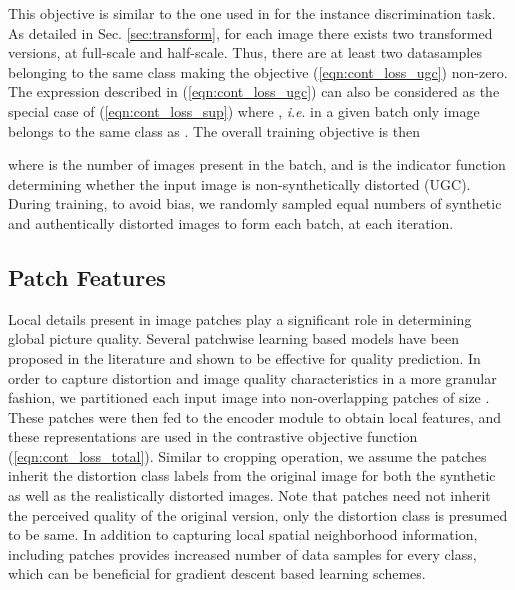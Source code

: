 \documentclass[journal]{IEEEtran}
\newcommand{\ie}{\textit{i}.\textit{e}.}
\begin{document}
This objective is similar to the one used in \cite{chen2020simple,he2020momentum} for the instance discrimination task. As detailed in Sec. \ref{sec:transform}, for each image there exists two transformed versions, at full-scale and half-scale. Thus, there are at least two datasamples belonging to the same class making the objective (\ref{eqn:cont_loss_ugc}) non-zero. The expression described in (\ref{eqn:cont_loss_ugc}) can also be considered as the special case of (\ref{eqn:cont_loss_sup}) where , \ie{} in a given batch only image  belongs to the same class as . The overall training objective is then

where  is the number of images present in the batch, and  is the indicator function determining whether the input image is non-synthetically distorted (UGC). During training, to avoid bias, we randomly sampled equal numbers of synthetic and authentically distorted images to form each batch, at each iteration.

\subsection{Patch Features}
Local details present in image patches play a significant role in determining global picture quality. Several patchwise learning based models have been proposed in the literature \cite{kang2014convolutional,kim2017deep} and shown to be effective for quality prediction. In order to capture distortion and image quality characteristics in a more granular fashion, we partitioned each input image into non-overlapping patches of size . These patches were then fed to the encoder module to obtain local features, and these representations are used in the contrastive objective function (\ref{eqn:cont_loss_total}). Similar to cropping operation, we assume the patches inherit the distortion class labels from the original image for both the synthetic as well as the realistically distorted images. Note that patches need not inherit the perceived quality of the original version, only the distortion class is presumed to be same. In addition to capturing local spatial neighborhood information, including patches provides increased number of data samples for every class, which can be beneficial for gradient descent based learning schemes. 
\end{document}
